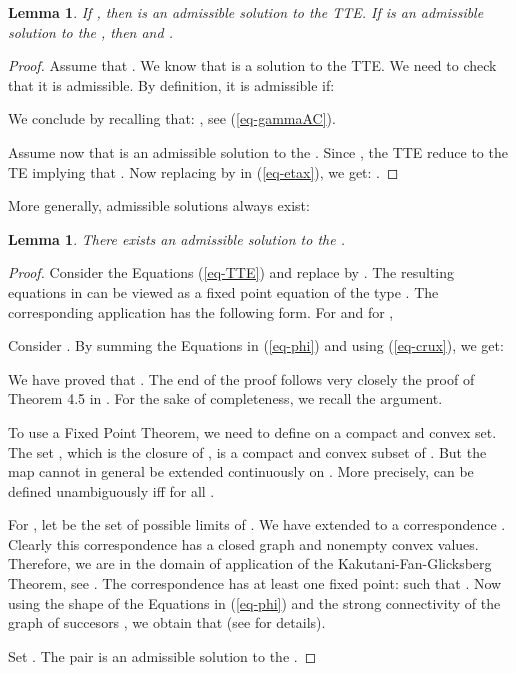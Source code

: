 \documentclass[11pt,a4paper]{article}
\newtheorem{lemma}[theorem]{Lemma}
\theoremstyle{remark}
\def\eref#1{(\ref{#1})}
\begin{document}
\begin{lemma}\label{le-tte2}
If , then 
is an admissible solution to the TTE.
If  is an admissible solution to the , then
 and .
\end{lemma}

\begin{proof}
Assume that .
We know that  is a solution to the TTE.
We need to check that it is admissible. By definition, it is
admissible if:

We conclude by recalling that: , see \eref{eq-gammaAC}.

Assume now that  is an admissible solution to the .
Since , the TTE reduce to
the TE implying that  . Now replacing  by
 in \eref{eq-etax}, we get:
.
\end{proof}

More generally, admissible solutions always exist:

\begin{lemma}\label{le-goodsol}
There exists an admissible solution to the
.
\end{lemma}

\begin{proof}
Consider the Equations \eref{eq-TTE} and replace  by
. The resulting equations in  can be
viewed as a fixed point equation of the type . The
corresponding application  has the following form. For 
and for ,


Consider . By summing the Equations in
\eref{eq-phi} and using \eref{eq-crux}, we get:

We have proved that
.
The end of the proof follows very closely the proof of Theorem 4.5 in
\cite{mair04}. For the sake of completeness, we recall the argument.

To use a Fixed Point Theorem, we need to define
 on a compact and convex set.
The set , which is the closure of , is a compact
and convex subset of . But the
map  cannot in general be extended continuously on
. More precisely,  can be
defined unambiguously iff  for all .

For , let  be the
set of possible limits of . We have extended  to a correspondence . Clearly this correspondence has a closed graph
and nonempty convex values. Therefore, we are in the domain of
application of the Kakutani-Fan-Glicksberg Theorem, see
\cite[Chapter 16]{AlBo}. The correspondence has at least one fixed
point:  such that . Now using
the shape of the Equations in \eref{eq-phi} and the strong
connectivity of the graph of succesors , we obtain
that  (see \cite[Theorem 4.5]{mair04} for details).

Set . The pair  is
an admissible
solution to the .
\end{proof}
\end{document}
